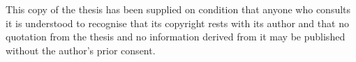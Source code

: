 This copy of the thesis has been supplied on condition that anyone who consults it is understood to recognise that its copyright rests with its author and that no quotation from the thesis and no information derived from it may be published without the author's prior consent.